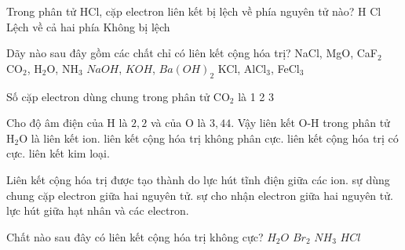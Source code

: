 \begin{ex}
	Trong phân tử HCl, cặp electron liên kết bị lệch về phía nguyên tử nào?
	\choice
	{H}
	{\True Cl}
	{Lệch về cả hai phía}
	{Không bị lệch}
\end{ex}
\begin{ex}
	Dãy nào sau đây gồm các chất chỉ có liên kết cộng hóa trị?
	\choice
	{NaCl, MgO, CaF$_2$}
	{\True CO$_2$, H$_2$O, NH$_3$}
	{$NaOH$, $KOH$, $Ba(OH)_2$}
	{KCl, AlCl$_3$, FeCl$_3$}
\end{ex}
\begin{ex}
	Số cặp electron dùng chung trong phân tử CO$_2$ là
	\choice
	{1}
	{2}
	{}
	{3}
\end{ex}
\begin{ex}
	Cho độ âm điện của H là $2{,}2$ và của O là $3{,}44$. Vậy liên kết O-H trong phân tử H$_2$O là
	\choice
	{liên kết ion.}
	{liên kết cộng hóa trị không phân cực.}
	{\True liên kết cộng hóa trị có cực.}
	{liên kết kim loại.}
\end{ex}
\begin{ex}
	Liên kết cộng hóa trị được tạo thành do
	\choice
	{lực hút tĩnh điện giữa các ion.}
	{\True sự dùng chung cặp electron giữa hai nguyên tử.}
	{sự cho nhận electron giữa hai nguyên tử.}
	{lực hút giữa hạt nhân và các electron.}
\end{ex}
\begin{ex}
	Chất nào sau đây có liên kết cộng hóa trị không cực?
	\choice
	{$H_2O$}
	{\True $Br_2$}
	{$NH_3$}
	{$HCl$}
\end{ex}
